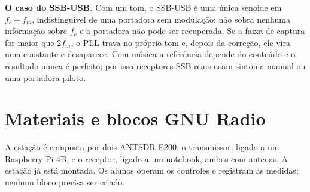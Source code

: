 \documentclass[11pt,a4paper]{article}
\begin{document}
\textbf{O caso do SSB-USB.} Com um tom, o SSB-USB é uma única senoide em
$f_c + f_m$, indistinguível de uma portadora sem modulação: não sobra nenhuma
informação sobre $f_c$ e a portadora não pode ser recuperada. Se a faixa de
captura for maior que $2f_m$, o PLL trava no próprio tom e, depois da correção,
ele vira uma constante e desaparece. Com música a referência depende do
conteúdo e o resultado nunca é perfeito; por isso receptores SSB reais usam
sintonia manual ou uma portadora piloto.

\section{Materiais e blocos GNU Radio}

A estação é composta por dois ANTSDR E200: o transmissor, ligado a um
Raspberry Pi 4B, e o receptor, ligado a um notebook, ambos com antenas. A
estação já está montada. Os alunos operam os controles e registram as medidas;
nenhum bloco precisa ser criado.
\end{document}
